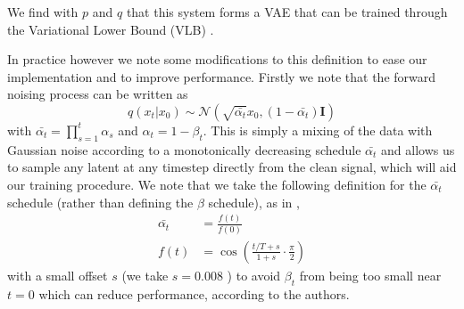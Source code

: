 We find with $p$ and $q$ that this system forms a VAE that can be trained through the Variational Lower Bound (VLB) \cite{kingma2022_VAE}.

In practice however we note some modifications to this definition to ease our implementation and to improve performance.
Firstly we note that the forward noising process can be written as
\begin{equation}
    \label{eq:direct_noising_latents}
    q(x_t|x_0) \sim \mathcal{N}(\sqrt{\bar{\alpha_t}}x_0, (1-\bar{\alpha_t})\mathbf{I})
\end{equation}
with $\bar{\alpha_t} = \prod_{s=1}^t \alpha_s$ and $\alpha_t = 1 - \beta_t$. This is simply a mixing of the data with Gaussian noise according to a monotonically decreasing schedule $\bar{\alpha_t}$ and allows us to sample any latent at any timestep directly from the clean signal, which will aid our training procedure. We note that we take the following definition for the $\bar{\alpha_t}$ schedule (rather than defining the $\beta$ schedule), as in \cite{improved_diffusion},
\begin{equation}
    \begin{aligned}
    \bar{\alpha_t} &= \frac{f(t)}{f(0)} \\
    f(t) &= \cos \left( \frac{t/T + s}{1 + s} \cdot \frac{\pi}{2} \right)
    \end{aligned}
\end{equation}
with a small offset $s$ (we take $s=0.008$ \cite{improved_diffusion}) to avoid $\beta_t$ from being too small near $t=0$ which can reduce performance, according to the authors.

